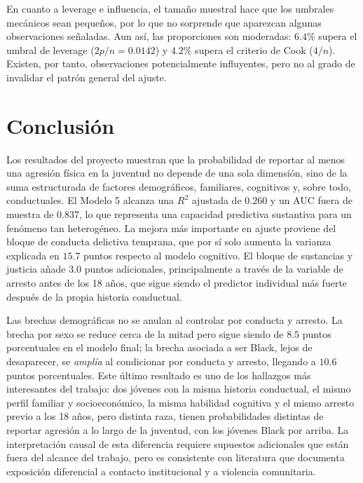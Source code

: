 \documentclass[11pt]{article}
\begin{document}
En cuanto a leverage e influencia, el tamaño muestral hace que los umbrales mecánicos sean pequeños, por lo que no sorprende que aparezcan algunas observaciones señaladas. Aun así, las proporciones son moderadas: $6.4\%$ supera el umbral de leverage ($2p/n = 0.0142$) y $4.2\%$ supera el criterio de Cook ($4/n$). Existen, por tanto, observaciones potencialmente influyentes, pero no al grado de invalidar el patrón general del ajuste.

\section{Conclusión}

Los resultados del proyecto muestran que la probabilidad de reportar al menos una agresión física en la juventud no depende de una sola dimensión, sino de la suma estructurada de factores demográficos, familiares, cognitivos y, sobre todo, conductuales. El Modelo 5 alcanza una $R^2$ ajustada de $0.260$ y un AUC fuera de muestra de $0.837$, lo que representa una capacidad predictiva sustantiva para un fenómeno tan heterogéneo. La mejora más importante en ajuste proviene del bloque de conducta delictiva temprana, que por sí solo aumenta la varianza explicada en $15.7$ puntos respecto al modelo cognitivo. El bloque de sustancias y justicia añade $3.0$ puntos adicionales, principalmente a través de la variable de arresto antes de los 18 años, que sigue siendo el predictor individual más fuerte después de la propia historia conductual.

Las brechas demográficas no se anulan al controlar por conducta y arresto. La brecha por sexo se reduce cerca de la mitad pero sigue siendo de $8.5$ puntos porcentuales en el modelo final; la brecha asociada a ser Black, lejos de desaparecer, se \textit{amplía} al condicionar por conducta y arresto, llegando a $10.6$ puntos porcentuales. Este último resultado es uno de los hallazgos más interesantes del trabajo: dos jóvenes con la misma historia conductual, el mismo perfil familiar y socioeconómico, la misma habilidad cognitiva y el mismo arresto previo a los 18 años, pero distinta raza, tienen probabilidades distintas de reportar agresión a lo largo de la juventud, con los jóvenes Black por arriba. La interpretación causal de esta diferencia requiere supuestos adicionales que están fuera del alcance del trabajo, pero es consistente con literatura que documenta exposición diferencial a contacto institucional y a violencia comunitaria.
\end{document}
